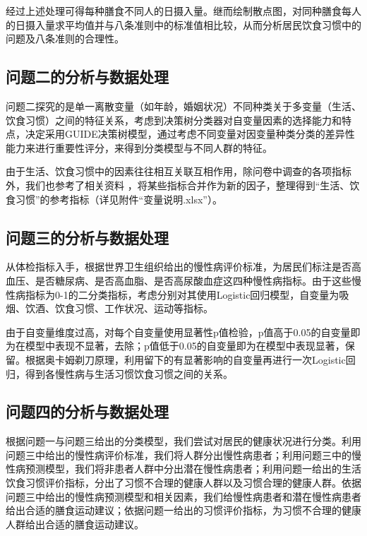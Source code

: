 \documentclass{article}
\numberwithin{equation}{subsection}
\begin{document}
经过上述处理可得每种膳食不同人的日摄入量。继而绘制散点图，对同种膳食每人的日摄入量求平均值并与八条准则中的标准值相比较，从而分析居民饮食习惯中的问题及八条准则的合理性。

\subsection{问题二的分析与数据处理}
问题二探究的是单一离散变量（如年龄，婚姻状况）不同种类关于多变量（生活、饮食习惯）之间的特征关系，考虑到决策树分类器对自变量因素的选择能力和特点，决定采用GUIDE决策树模型，通过考虑不同变量对因变量种类分类的差异性能力来进行重要性评分，来得到分类模型与不同人群的特征。

由于生活、饮食习惯中的因素往往相互关联互相作用，除问卷中调查的各项指标外，我们也参考了相关资料 \cite {1}，将某些指标合并作为新的因子，整理得到“生活、饮食习惯”的参考指标（详见附件“变量说明.xlsx”）。

\subsection{问题三的分析与数据处理}
从体检指标入手，根据世界卫生组织给出的慢性病评价标准，为居民们标注是否高血压、是否糖尿病、是否高血脂、是否高尿酸血症这四种慢性病指标。由于这些慢性病指标为0-1的二分类指标，考虑分别对其使用Logistic回归模型，自变量为吸烟、饮酒、饮食习惯、工作状况、运动等指标。

由于自变量维度过高，对每个自变量使用显著性p值检验，p值高于0.05的自变量即为在模型中表现不显著，去除；p值低于0.05的自变量即为在模型中表现显著，保留。根据奥卡姆剃刀原理，利用留下的有显著影响的自变量再进行一次Logistic回归，得到各慢性病与生活习惯饮食习惯之间的关系。

\subsection{问题四的分析与数据处理}
根据问题一与问题三给出的分类模型，我们尝试对居民的健康状况进行分类。利用问题三中给出的慢性病评价标准，我们将人群分出慢性病患者；利用问题三中的慢性病预测模型，我们将非患者人群中分出潜在慢性病患者；利用问题一给出的生活饮食习惯评价指标，分出了习惯不合理的健康人群以及习惯合理的健康人群。依据问题三中给出的慢性病预测模型和相关因素，我们给慢性病患者和潜在慢性病患者给出合适的膳食运动建议；依据问题一给出的习惯评价指标，为习惯不合理的健康人群给出合适的膳食运动建议。
\end{document}
